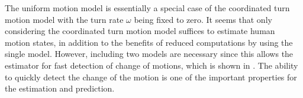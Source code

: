 \documentclass[letterpaper, 10 pt, conference]{ieeeconf}
\begin{document}
	The uniform motion model is essentially a special case of the coordinated turn motion model with the turn rate $\omega$ being fixed to zero.
	It seems that only considering the coordinated turn motion model suffices to estimate human motion states, in addition to the benefits of reduced computations by using the single model.
	However, including two models are necessary since this allows the estimator for fast detection of change of motions, which is shown in \cite{}.
	The ability to quickly detect the change of the motion is one of the important properties for the estimation and prediction.          	
	
	
\end{document}
